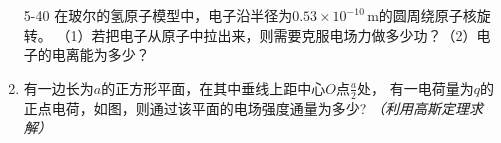 \documentclass[UTF-8]{ctexart}
\begin{document}
\begin{enumerate}
    \item[5-40] 在玻尔的氢原子模型中，电子沿半径为\(0.53\times10^{-10}\,\mathrm{m}\)的圆周绕原子核旋转。
        （1）若把电子从原子中拉出来，则需要克服电场力做多少功？（2）电子的电离能为多少？
    \item \label{itm:1} 有一边长为\(a\)的正方形平面，在其中垂线上距中心\(O\)点\(\frac{a}{2}\)处，
    有一电荷量为\(q\)的正点电荷，如图，则通过该平面的电场强度通量为多少? 
    \textit{\small（利用高斯定理求解）}     
    

\end{enumerate}
\end{document}
